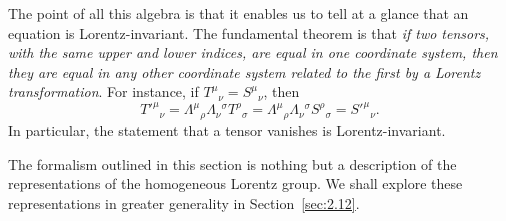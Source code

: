 The point of all this algebra is that it enables us to tell at a glance that an
equation is Lorentz-invariant. The fundamental theorem is that \emph{if two
tensors, with the same upper and lower indices, are equal in one coordinate
system, then they are equal in any other coordinate system related to the first
by a Lorentz transformation}. For instance, if
\(T^\mu{}_\nu=S^\mu{}_\nu\), then
\[
  T'^\mu{}_\nu
  =\Lambda^\mu{}_\rho\Lambda_\nu{}^\sigma T^\rho{}_\sigma
  =\Lambda^\mu{}_\rho\Lambda_\nu{}^\sigma S^\rho{}_\sigma
  =S'^\mu{}_\nu .
\]
In particular, the statement that a tensor vanishes is Lorentz-invariant.

The formalism outlined in this section is nothing but a description of the
representations of the homogeneous Lorentz group. We shall explore these
representations in greater generality in Section~\ref{sec:2.12}.
